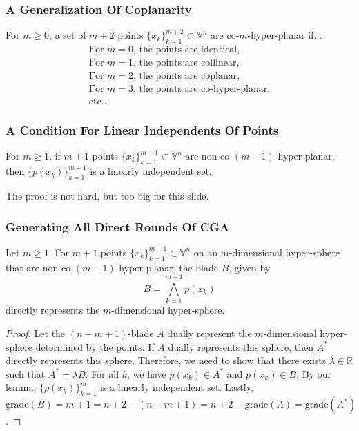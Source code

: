 \documentclass{beamer}
\newcommand{\V}{\mathbb{V}}
\newcommand{\R}{\mathbb{R}}
\newcommand{\grade}{\mbox{grade}}
\begin{document}
\begin{frame}
\frametitle{A Generalization Of Coplanarity}
\begin{definition}
For $m\geq 0$, a set of $m+2$ points $\{x_k\}_{k=1}^{m+2}\subset\V^n$ are \alert{co-$m$-hyper-planar} if...
\begin{equation*}
\begin{array}{l}
\mbox{For $m=0$, the points are identical,} \\
\mbox{For $m=1$, the points are collinear,} \\
\mbox{For $m=2$, the points are coplanar,} \\
\mbox{For $m=3$, the points are co-hyper-planar,} \\
\mbox{etc...}
\end{array}
\end{equation*}
\end{definition}
\end{frame}

\begin{frame}
\frametitle{A Condition For Linear Independents Of Points}
\begin{lemma}
For $m\geq 1$, if $m+1$ points $\{x_k\}_{k=1}^{m+1}\subset\V^n$ are non-co-$(m-1)$-hyper-planar,
then $\{p(x_k)\}_{k=1}^{m+1}$ is a linearly independent set.
\end{lemma}\pause
The proof is not hard, but too big for this slide.
\end{frame}

\begin{frame}
\frametitle{Generating All \alert{Direct Rounds} Of CGA}
Let $m\geq 1$.
For $m+1$ points $\{x_k\}_{k=1}^{m+1}\subset\V^n$ on an $m$-dimensional
hyper-sphere that are non-co-$(m-1)$-hyper-planar,
the blade $B$, given by
\begin{equation*}
B = \bigwedge_{k=1}^{m+1} p(x_k)
\end{equation*}
\alert{directly} represents the $m$-dimensional hyper-sphere.\pause
\begin{proof}
Let the $(n-m+1)$-blade $A$ \alert{dually} represent the $m$-dimensional hyper-sphere determined by the points.
If $A$ \alert{dually} represents this sphere, then $A^*$ \alert{directly} represents this sphere.
Therefore, we need to show that there exists $\lambda\in\R$ such that $A^*=\lambda B$.
For all $k$, we have $p(x_k)\in A^*$ and $p(x_k)\in B$.
By our lemma, $\{p(x_k)\}_{k=1}^m$ is a linearly independent set.
Lastly, $\grade(B) = m+1 = n+2-(n-m+1) = n+2-\grade(A) = \grade(A^*)$.
\end{proof}
\end{frame}
\end{document}
